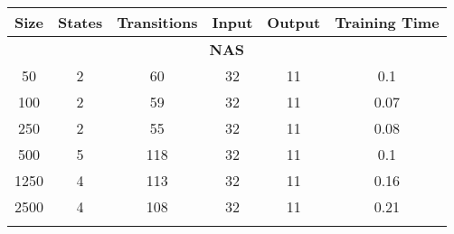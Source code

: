 \begin{table}[]
  \centering
\begin{tabular}{cccccc}
\hline
\multicolumn{1}{|c|}{\textbf{Size}} & \multicolumn{1}{c|}{\textbf{States}} & \multicolumn{1}{c|}{\textbf{Transitions}} & \multicolumn{1}{c|}{\textbf{Input}} & \multicolumn{1}{c|}{\textbf{Output}} & \multicolumn{1}{c|}{\textbf{Training Time}} \\ \hline
\multicolumn{6}{|c|}{\textbf{NAS}}                                                                                                                                                                                                                \\ \hline
\multicolumn{1}{|c|}{50}            & \multicolumn{1}{c|}{2}               & \multicolumn{1}{c|}{60}                   & \multicolumn{1}{c|}{32}             & \multicolumn{1}{c|}{11}              & \multicolumn{1}{c|}{0.1}                    \\ \hline
\multicolumn{1}{|c|}{100}           & \multicolumn{1}{c|}{2}               & \multicolumn{1}{c|}{59}                   & \multicolumn{1}{c|}{32}             & \multicolumn{1}{c|}{11}              & \multicolumn{1}{c|}{0.07}                   \\ \hline
\multicolumn{1}{|c|}{250}           & \multicolumn{1}{c|}{2}               & \multicolumn{1}{c|}{55}                   & \multicolumn{1}{c|}{32}             & \multicolumn{1}{c|}{11}              & \multicolumn{1}{c|}{0.08}                   \\ \hline
\multicolumn{1}{|c|}{500}           & \multicolumn{1}{c|}{5}               & \multicolumn{1}{c|}{118}                  & \multicolumn{1}{c|}{32}             & \multicolumn{1}{c|}{11}              & \multicolumn{1}{c|}{0.1}                    \\ \hline
\multicolumn{1}{|c|}{1250}          & \multicolumn{1}{c|}{4}               & \multicolumn{1}{c|}{113}                  & \multicolumn{1}{c|}{32}             & \multicolumn{1}{c|}{11}              & \multicolumn{1}{c|}{0.16}                   \\ \hline
\multicolumn{1}{|c|}{2500}          & \multicolumn{1}{c|}{4}               & \multicolumn{1}{c|}{108}                  & \multicolumn{1}{c|}{32}             & \multicolumn{1}{c|}{11}              & \multicolumn{1}{c|}{0.21}                   \\ \hline
                                    &                                      &                                           &                                     &                                      &                                             \\ \hline

\end{tabular}
\end{table}
